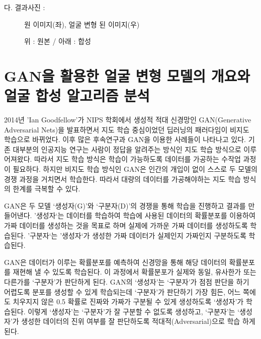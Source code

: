 \documentclass{oblivoir}
\begin{document}
    다. 결과사진 :

    \begin{figure}[h!]
        \centering
    \caption{원 이미지(좌), 얼굴 변형 된 이미지(우)}
    \end{figure}

    \begin{figure}[h!]
        \centering
    \caption{위 : 원본 / 아래 : 합성}
    \end{figure}
        



   \section{ GAN을 활용한 얼굴 변형 모델의 개요와 얼굴 합성 알고리즘 분석}

2014년 'Ian Goodfellow'가 NIPS 학회에서 생성적 적대 신경망인 GAN(Generative Adversarial Nets)을 발표하면서 지도 학습 중심이었던 딥러닝의 패러다임이 비지도 학습으로 바뀌었다. 이후 많은 후속연구과 GAN을 이용한 사례들이 나타나고 있다. 기존 대부분의 인공지능 연구는 사람이 정답을 알려주는 방식인 지도 학습 방식으로 이루어져왔다. 따라서 지도 학습 방식은 학습이 가능하도록 데이터를 가공하는 수작업 과정이 필요하다. 하지만 비지도 학습 방식인 GAN은 인간의 개입이 없이 스스로 두 모델의 경쟁 과정을 거치면서 학습한다. 따라서 대량의 데이터를 가공해야하는 지도 학습 방식의 한계를 극복할 수 있다.

GAN은 두 모델 ‘생성자(G)’와 ‘구분자(D)’의 경쟁을 통해 학습을 진행하고 결과를 만들어낸다. '생성자‘는 데이터를 학습하여 학습에 사용된 데이터의 확률분포를 이용하여 가짜 데이터를 생성하는 것을 목표로 하며 실제에 가까운 가짜 데이터를 생성하도록 학습된다. ’구분자‘는 ’생성자‘가 생성한 가짜 데이터가 실제인지 가짜인지 구분하도록 학습된다.

GAN은 데이터가 이루는 확률분포를 예측하여 신경망을 통해 해당 데이터의 확률분포를 재현해 낼 수 있도록 학습된다. 이 과정에서 확률분포가 실제와 동일, 유사한가 또는 다른가를 ‘구분자’가 판단하게 된다. GAN의 ‘생성자’는 ‘구분자’가 점점 판단을 하기 어렵도록 분포를 생성할 수 있게 학습되는데 ‘구분자’가 판단하기 가장 힘든, 어느 쪽에도 치우지지 않은 0.5 확률로 진짜와 가짜가 구분될 수 있게 생성하도록 ‘생성자’가 학습된다. 이렇게 ‘생성자’는 ‘구분자’가 잘 구분할 수 없도록 생성하고, ‘구분자’는 ‘생성자’가 생성한 데이터의 진위 여부를 잘 판단하도록 적대적(Adversarial)으로 학습 하게 된다.
\end{document}
